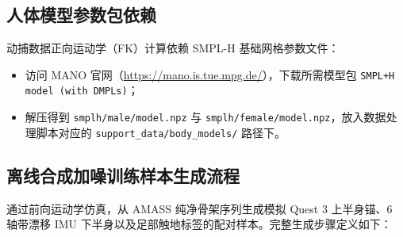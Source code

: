 \documentclass[UTF8,11pt,a4paper]{ctexart}
\begin{document}
\subsection{人体模型参数包依赖}
动捕数据正向运动学（FK）计算依赖 SMPL-H 基础网格参数文件：
\begin{itemize}
    \item 访问 MANO 官网（\url{https://mano.is.tue.mpg.de/}），下载所需模型包 \texttt{SMPL+H model (with DMPLs)}；
    \item 解压得到 \texttt{smplh/male/model.npz} 与 \texttt{smplh/female/model.npz}，放入数据处理脚本对应的 \texttt{support\_data/body\_models/} 路径下。
\end{itemize}

\subsection{离线合成加噪训练样本生成流程}
通过前向运动学仿真，从 AMASS 纯净骨架序列生成模拟 Quest 3 上半身锚、6 轴带漂移 IMU 下半身以及足部触地标签的配对样本。完整生成步骤定义如下：
\end{document}
